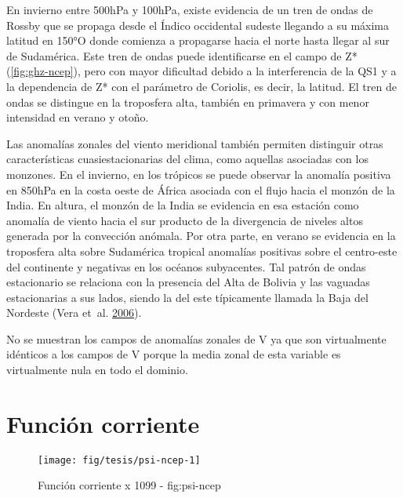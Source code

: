 \documentclass[spanish,a4paper,12p]{book}
\begin{document}
En invierno entre 500hPa y 100hPa, existe evidencia de un tren de ondas
de Rossby que se propaga desde el Índico occidental sudeste llegando a
su máxima latitud en 150°O donde comienza a propagarse hacia el norte
hasta llegar al sur de Sudamérica. Este tren de ondas puede
identificarse en el campo de Z* (\autoref{fig:ghz-ncep}), pero con mayor
dificultad debido a la interferencia de la QS1 y a la dependencia de Z*
con el parámetro de Coriolis, es decir, la latitud. El tren de ondas se
distingue en la troposfera alta, también en primavera y con menor
intensidad en verano y otoño.

Las anomalías zonales del viento meridional también permiten distinguir
otras características cuasiestacionarias del clima, como aquellas
asociadas con los monzones. En el invierno, en los trópicos se puede
observar la anomalía positiva en 850hPa en la costa oeste de África
asociada con el flujo hacia el monzón de la India. En altura, el monzón
de la India se evidencia en esa estación como anomalía de viento hacia
el sur producto de la divergencia de niveles altos generada por la
convección anómala. Por otra parte, en verano se evidencia en la
troposfera alta sobre Sudamérica tropical anomalías positivas sobre el
centro-este del continente y negativas en los océanos subyacentes. Tal
patrón de ondas estacionario se relaciona con la presencia del Alta de
Bolivia y las vaguadas estacionarias a sus lados, siendo la del este
típicamente llamada la Baja del Nordeste (Vera et~al.
\protect\hyperlink{ref-Vera2006}{2006}).

No se muestran los campos de anomalías zonales de V ya que son
virtualmente idénticos a los campos de V porque la media zonal de esta
variable es virtualmente nula en todo el dominio.

\begin{landscape}\end{landscape}

\section{Función corriente}\label{funcion-corriente}

\begin{landscape}\begin{figure}

{\centering \texttt{[image: fig/tesis/psi-ncep-1]} 

}

\caption{Función corriente x 1099 - fig:psi-ncep}\label{fig:psi-ncep}
\end{figure}
\end{landscape}
\end{document}
